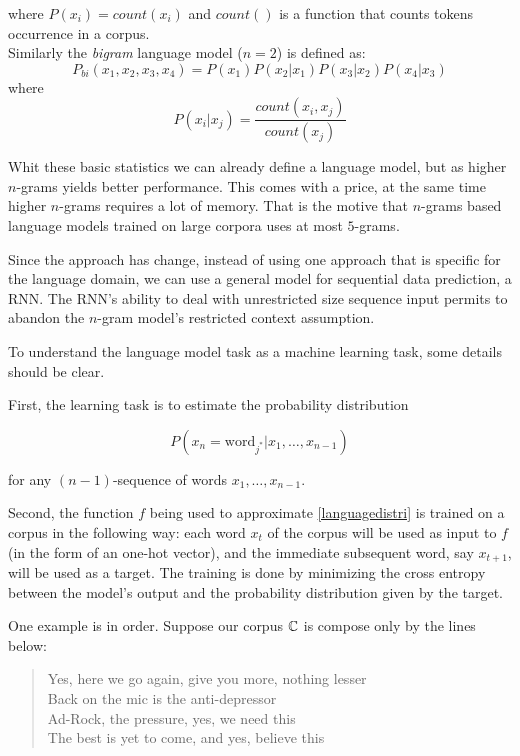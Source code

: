 where $P(x_i) = count(x_i)$ and $count()$ is a function that counts tokens occurrence in a corpus.\\

Similarly the \textit{bigram} language model ($n=2$) is defined as: 
\begin{equation}
P_{bi}(x_1,x_2,x_3,x_4) = P(x_1)P(x_2\vert x_1)P(x_3\vert x_2)P(x_4\vert x_3)
\end{equation} 
where
\begin{equation}
P(x_i\vert x_j) = \frac{count(x_i, x_j)}{count(x_j)}
\end{equation} 

Whit these basic statistics we can already define a language model, but as higher $n$-grams yields better performance. This comes with a price, at the same time higher $n$-grams requires a lot of memory\cite{Heafield}. That is the motive that $n$-grams based language models trained on large corpora uses at most $5$-grams. 

Since \cite{Mikolov11} the approach has change, instead of using one approach that is specific for the language domain, we can use a general model for sequential data prediction, a RNN. The RNN's ability to deal with unrestricted size sequence input permits to abandon the $n$-gram model's restricted context assumption.

To understand the language model task as a machine learning task, some details should be clear. 

First, the learning task is to estimate the probability distribution 

\begin{equation}
\label{languagedistri}
P(x_{n} = \text{word}_{j^{*}} | x_{1}, \dots ,x_{n-1})
\end{equation}

for any $(n-1)$-sequence of words $x_{1}, \dots ,x_{n-1}$.


Second, the function $f$ being used to approximate \ref{languagedistri} is trained on a corpus in the following way: each word $x_t$ of the corpus will be used as input to $f$ (in the form of an one-hot vector), and the immediate subsequent word, say $x_{t+1}$, will be used as a target. The training is done by minimizing the cross entropy between the model's output and the probability distribution given by the target.

One example is in order. Suppose our corpus $\mathbb{C}$ is compose only by the lines below:

\begin{quote}
Yes, here we go again, give you more, nothing lesser\\
Back on the mic is the anti-depressor\\
Ad-Rock, the pressure, yes, we need this\\
The best is yet to come, and yes, believe this\\
\end{quote}


